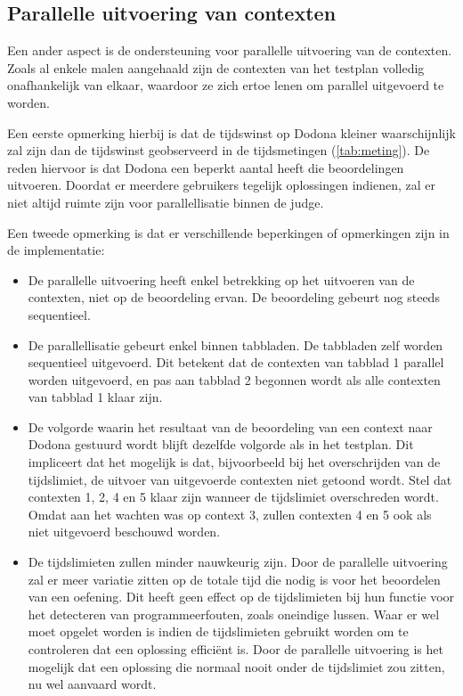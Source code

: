 \subsection{Parallelle uitvoering van contexten}\label{subsec:parallelle-uitvoering-van-contexten}

Een ander aspect is de ondersteuning voor parallelle uitvoering van de contexten.
Zoals al enkele malen aangehaald zijn de contexten van het testplan volledig onafhankelijk van elkaar, waardoor ze zich ertoe lenen om parallel uitgevoerd te worden.

Een eerste opmerking hierbij is dat de tijdswinst op Dodona kleiner waarschijnlijk zal zijn dan de tijdswinst geobserveerd in de tijdsmetingen (\cref{tab:meting}).
De reden hiervoor is dat Dodona een beperkt aantal  heeft die beoordelingen uitvoeren.
Doordat er meerdere gebruikers tegelijk oplossingen indienen, zal er niet altijd ruimte zijn voor parallellisatie binnen de judge.

Een tweede opmerking is dat er verschillende beperkingen of opmerkingen zijn in de implementatie:

\begin{itemize}
    \item De parallelle uitvoering heeft enkel betrekking op het uitvoeren van de contexten, niet op de beoordeling ervan.
    De beoordeling gebeurt nog steeds sequentieel.
    \item De parallellisatie gebeurt enkel binnen tabbladen.
    De tabbladen zelf worden sequentieel uitgevoerd.
    Dit betekent dat de contexten van tabblad 1 parallel worden uitgevoerd, en pas aan tabblad 2 begonnen wordt als alle contexten van tabblad 1 klaar zijn.
    \item De volgorde waarin het resultaat van de beoordeling van een context naar Dodona gestuurd wordt blijft dezelfde volgorde als in het testplan.
    Dit impliceert dat het mogelijk is dat, bijvoorbeeld bij het overschrijden van de tijdslimiet, de uitvoer van uitgevoerde contexten niet getoond wordt.
    Stel dat contexten 1, 2, 4 en 5 klaar zijn wanneer de tijdslimiet overschreden wordt.
    Omdat \tested{} aan het wachten was op context 3, zullen contexten 4 en 5 ook als niet uitgevoerd beschouwd worden.
    \item De tijdslimieten zullen minder nauwkeurig zijn.
    Door de parallelle uitvoering zal er meer variatie zitten op de totale tijd die nodig is voor het beoordelen van een oefening.
    Dit heeft geen effect op de tijdslimieten bij hun functie voor het detecteren van programmeerfouten, zoals oneindige lussen.
    Waar er wel moet opgelet worden is indien de tijdslimieten gebruikt worden om te controleren dat een oplossing efficiënt is.
    Door de parallelle uitvoering is het mogelijk dat een oplossing die normaal nooit onder de tijdslimiet zou zitten, nu wel aanvaard wordt.
\end{itemize}


